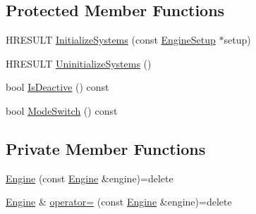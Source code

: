 \subsection*{Protected Member Functions}
\begin{DoxyCompactItemize}
\item 
H\+R\+E\+S\+U\+LT \hyperlink{classmage_1_1_engine_ac43f1de00841a6fe51c9e4567ac47bd1}{Initialize\+Systems} (const \hyperlink{structmage_1_1_engine_setup}{Engine\+Setup} $\ast$setup)
\item 
H\+R\+E\+S\+U\+LT \hyperlink{classmage_1_1_engine_ad760164f873e1d15aa8826d532b6d551}{Uninitialize\+Systems} ()
\item 
bool \hyperlink{classmage_1_1_engine_a83c3ed26138932f8b17daa20526b100e}{Is\+Deactive} () const
\item 
bool \hyperlink{classmage_1_1_engine_a54cb08ec26da300b0c7ca4e7f9a35e0b}{Mode\+Switch} () const
\end{DoxyCompactItemize}
\subsection*{Private Member Functions}
\begin{DoxyCompactItemize}
\item 
\hyperlink{classmage_1_1_engine_afd2f4f32b2e803f59521aafe1924f0ba}{Engine} (const \hyperlink{classmage_1_1_engine}{Engine} \&engine)=delete
\item 
\hyperlink{classmage_1_1_engine}{Engine} \& \hyperlink{classmage_1_1_engine_a1eedff82d4c8207c61676230520648fd}{operator=} (const \hyperlink{classmage_1_1_engine}{Engine} \&engine)=delete
\end{DoxyCompactItemize}
